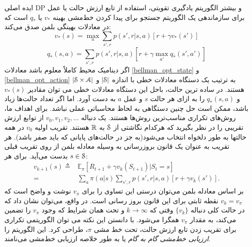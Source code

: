 ایده اصلی DP و بیشتر الگوریتم یادگیری تقویتی‌، استفاده از تابع ارزش حالت یا عمل برای سازماندهی یک الگوریتم جستجو برای پیدا کردن خط‌مشی بهینه
$v_*$
یا
$q_*$
است
که در معادلات بهینگی بلمن صدق می‌کند:
\begin{equation}
v_{*}(s) = \max_{a} \sum_{s',r} p(s',r | s,a)[r + \gamma v_*(s')]
\label{bellman_opt_state}
\end{equation}
\begin{equation}
q_{*}(s,a) = \sum_{s',r} p(s',r | s,a)[r + \gamma \max_{a'} q_* (s',a')]
\label{bellman_opt_action}
\end{equation}
اگر دینامیک محیط کاملاً معلوم باشد معادلات
\ref{bellman_opt_state}
و
\ref{bellman_opt_action}
به ترتیب یک دستگاه معادلات خطی با اندازه
 $|\EuScript{S}|$
 و
 $|\EuScript{S} \times \EuScript{A}|$
  هستند.
در ساده ترین حالت، باحل این دستگاه معادلات  خطی می توان  مقادیر 
$v_*(s)$
و
$q_*(s,a)$
را به ازای هر حالت $s$ و عمل $a$ به دست آورد. اما اگر تعداد حالت‌ها زیاد باشد، ممکن است حل چنین دستگاهی به لحاظ محاسباتی عملی نباشد. برای اهداف ما، روش‌های تکراری مناسب‌ترین روش‌ها هستند. یک دنباله $ v_0 , v_1 , v_2 , ...$ 
از توابع ارزش تقریبی
را در نظر بگیرید که هرکدام نگاشتی از
$\EuScript{S}$ 
به 
$\mathbb{R}$
 هستند.
تقریب اولیه $v_0$
در همه حالت\nf ها
به طور دلخواه انتخاب می‌شود(به جز در حالت‌های پایانی که باید صفر باشد). هر تقریب به عنوان یک قانون بروزرسانی به وسیله معادله بلمن از روی تقریب قبلی بدست می‌آید. برای هر 
$s \in \EuScript{S}$:
\begin{align}
v_{k+1}(s) \triangleq & \mathbb{E}_{\pi} [R_{t+1} + \gamma v_k(S_{t+1}) | S_t=s]  \nonumber \\
=& \sum_{a} \pi(a|s) \sum_{s',r} p(s',r | s,a)[r + \gamma v_k(s')].
\end{align}
بر اساس معادله بلمن می‌توان درستی این تساوی را برای 
$v_{\pi}$
نوشت و واضح است که 
 $v_k = v_{\pi}$
 نقطه ثابتی برای این قانون بروز رسانی است.
 در واقع، می‌توان نشان داد که در حالت کلی دنباله 
 $\{ v_k \}$
وقتی که 
$ k \rightarrow \infty $
و تحت همان شرایط که وجود 
$v_{\pi}$
را تضمین می‌کند، به مقدار 
$v_{\pi}$
همگرا می‌شود. با دانستن این نکته می توان الگوریتمی تکراری برای  تقریب زدن تابع ارزش حالت، تحت خط مشی $\pi$، طراحی کرد. این الگوریتم را 
\textit{ارزیابی خط‌مشی گام به گام}
 یا به طور خلاصه 
ارزیابی خط‌مشی
 می‌نامند.


